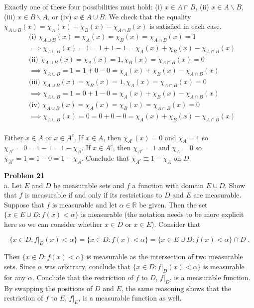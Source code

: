 \documentclass[a4paper]{article}
\begin{document}
Exactly one of these four possibilities must hold: (i) $x \in A\cap B$, (ii) $x \in A\backslash B$, (iii) $x \in B\backslash A$, or (iv) $x \not\in A\cup B$. We check that the equality $\chi_{A\cup B}(x) = \chi_A(x) + \chi_B(x) - \chi_{A\cap B}(x)$ is satisfied in each case. \begin{align*}
&\text{(i) } \chi_{A\cup B}(x) = \chi_{A}(x) = \chi_{B}(x)  = \chi_{A\cap B}(x) = 1\\
&\implies \chi_{A\cup B}(x) = 1 = 1+1 - 1 = \chi_{A}(x) + \chi_{B}(x) - \chi_{A\cap B}(x) \\
&\text{(ii) } \chi_{A\cup B}(x) = \chi_{A}(x) = 1, \chi_{B}(x)  = \chi_{A\cap B}(x) = 0\\
&\implies \chi_{A\cup B} = 1 = 1+0 - 0 = \chi_{A}(x) + \chi_{B}(x) - \chi_{A\cap B}(x) \\
&\text{(iii) } \chi_{A\cup B}(x) = \chi_{B}(x) = 1, \chi_{A}(x)  = \chi_{A\cap B}(x) = 0 \\
&\implies \chi_{A\cup B} = 1 = 0+1 - 0 = \chi_{A}(x) + \chi_{B}(x) - \chi_{A\cap B}(x) \\
&\text{(iv) } \chi_{A\cup B}(x) = \chi_{A}(x) = \chi_{B}(x)  = \chi_{A\cap B}(x) = 0 \\
&\implies \chi_{A\cup B}(x) = 0 = 0+0-0= \chi_{A}(x) + \chi_{B}(x) - \chi_{A\cap B}(x) \\
\end{align*}

Either $x \in A$ or $x \in A^c$. If $x \in A$, then $\chi_{A^c}(x) = 0$ and $\chi_{A} = 1$ so $\chi_{A^c} = 0 = 1-1 = 1-\chi_{A}$. If $x \in A^c$, then $\chi_{A^c} = 1$ and $\chi_{A} = 0$ so $\chi_{A^c} = 1 = 1 - 0 = 1-\chi_{A}$. Conclude that $\chi_{A^c} \equiv 1- \chi_{A}$ on $D$. 


{\bf Problem 21}\\

a. Let $E$ and $D$ be measurable sets and $f$ a function with domain $E\cup D$. Show that $f$ is measurable if and only if its restrictions to $D$ and $E$ are measurable. \\

Suppose that $f$ is measurable and let $\alpha \in \mathbb{R}$ be given. Then the set $\{x \in E\cup D : f(x) < \alpha\}$ is measurable (the notation needs to be more explicit here so we can consider whether $x \in D$ or $x \in E$). Consider that

$$\{x \in D : f\rvert_D(x) < \alpha\} = \{x \in D : f(x) < \alpha\} = \{x \in E\cup D : f(x) < \alpha\} \cap D \;.$$

Then $\{x \in D : f(x) < \alpha\}$ is measurable as the intersection of two measurable sets. Since $\alpha$ was arbitrary, conclude that $\{x \in D : f\rvert_D(x) < \alpha\}$ is measurable for any $\alpha$. Conclude that the restriction of $f$ to $D$, $f\rvert_D$, is a measurable function. By swapping the positions of $D$ and $E$, the same reasoning shows that the restriction of $f$ to $E$, $f\rvert_E$, is a measurable function as well. \\
\end{document}
